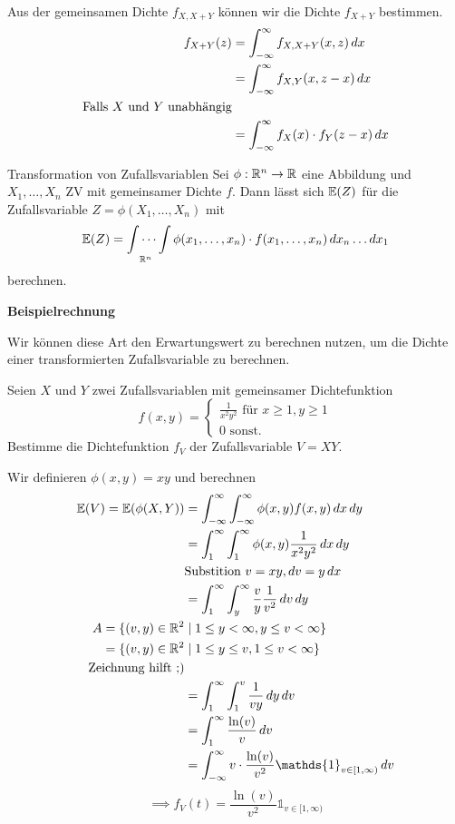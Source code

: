 Aus der gemeinsamen Dichte $f_{X, X + Y}$ können wir die Dichte $f_{X + Y}$ bestimmen.
\begin{align*}
    f_{X+Y}(z) &= \int_{-\infty}^{\infty}f_{X, X + Y}(x, z) \mathop{dx}\\
    &= \int_{-\infty}^{\infty} f_{X,Y}(x, z-x) \mathop{dx}\\
    \text{Falls $X$ und $Y$ unabhängig}\\
    &= \int_{-\infty}^{\infty}f_X(x)\cdot f_Y(z-x) \mathop{dx}
\end{align*}
\begin{subbox}{Transformation von Zufallsvariablen}
    Sei $\phi: \mathbb{R}^n \to \mathbb{R}$ eine Abbildung und $X_1, \ldots, X_n$ ZV mit gemeinsamer Dichte $f$. 
    Dann lässt sich $\mathbb{E}(Z)$ für die Zufallsvariable $Z=\phi(X_1, \ldots, X_n)$ mit 
    $$\mathbb{E}(Z) =\idotsint\limits_{\mathbb{R}^n}\phi(x_1, \ldots, x_n)\cdot f(x_1, \ldots, x_n)\mathop{dx_n}\ldots\mathop{dx_1}$$
    berechnen.
\end{subbox}
\textbf{Beispielrechnung}

Wir können diese Art den Erwartungswert zu berechnen nutzen, um die Dichte einer transformierten Zufallsvariable zu berechnen.

Seien $X$ und $Y$ zwei Zufallsvariablen mit gemeinsamer Dichtefunktion
$$f(x,y) = \begin{cases}
    \frac{1}{x^2y^2} \text{ für } x \geq 1, y \geq 1\\
    0 \text{ sonst.}
\end{cases}$$
Bestimme die Dichtefunktion $f_V$ der Zufallsvariable $V = XY$.

Wir definieren $\phi(x, y) = xy$ und berechnen 
\begin{align*}
    \E(V) = \E(\phi(X,Y)) &= \int_{-\infty}^{\infty}\int_{-\infty}^{\infty}\phi(x,y)f(x,y)\dx\mathop{dy}\\
    &= \int_{1}^{\infty}\int_{1}^{\infty}\phi(x, y)\frac{1}{x^2y^2}\dx\mathop{dy}\\
    &\text{Substition } v = xy, \mathop{dv} = y\mathop{dx}\\
    &= \int_{1}^{\infty}\int_{y}^{\infty}\frac{v}{y}\frac{1}{v^2}\mathop{dv}\mathop{dy}\\
    A = \{(v, y) \in \R^2 &\mid 1 \leq y < \infty, y \leq v < \infty\}\\
    = \{(v, y) \in \R^2 &\mid 1 \leq y \leq v, 1 \leq v < \infty\}\\
    \text{Zeichnung hilft ;)}\\
    &= \int_{1}^{\infty}\int_{1}^{v}\frac{1}{vy}\mathop{dy}\mathop{dv}\\
    &= \int_{1}^{\infty}\frac{\ln(v)}{v}\mathop{dv}\\
    &= \int_{-\infty}^{\infty}v \cdot \frac{\ln(v)}{v^2}\mathds{1}_{v \in [1,\infty)}\mathop{dv}
\end{align*}
$$\implies f_V(t) = \frac{\ln(v)}{v^2}\mathds{1}_{v \in [1,\infty)}$$

